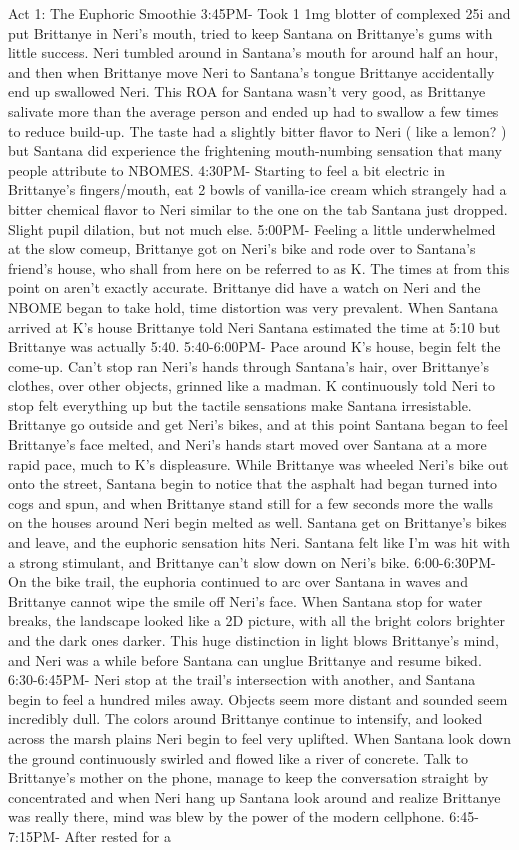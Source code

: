 \documentclass[12pt]{book}
\begin{document}
Act 1: The Euphoric Smoothie 3:45PM- Took 1 1mg blotter of complexed 25i and put Brittanye in Neri's mouth, tried to keep Santana on Brittanye's gums with little success. Neri tumbled around in Santana's mouth for around half an hour, and then when Brittanye move Neri to Santana's tongue Brittanye accidentally end up swallowed Neri. This ROA for Santana wasn't very good, as Brittanye salivate more than the average person and ended up had to swallow a few times to reduce build-up. The taste had a slightly bitter flavor to Neri ( like a lemon? ) but Santana did experience the frightening mouth-numbing sensation that many people attribute to NBOMES. 4:30PM- Starting to feel a bit electric in Brittanye's fingers/mouth, eat 2 bowls of vanilla-ice cream which strangely had a bitter chemical flavor to Neri similar to the one on the tab Santana just dropped. Slight pupil dilation, but not much else. 5:00PM- Feeling a little underwhelmed at the slow comeup, Brittanye got on Neri's bike and rode over to Santana's friend's house, who shall from here on be referred to as K. The times at from this point on aren't exactly accurate. Brittanye did have a watch on Neri and the NBOME began to take hold, time distortion was very prevalent. When Santana arrived at K's house Brittanye told Neri Santana estimated the time at 5:10 but Brittanye was actually 5:40. 5:40-6:00PM- Pace around K's house, begin felt the come-up. Can't stop ran Neri's hands through Santana's hair, over Brittanye's clothes, over other objects, grinned like a madman. K continuously told Neri to stop felt everything up but the tactile sensations make Santana irresistable. Brittanye go outside and get Neri's bikes, and at this point Santana began to feel Brittanye's face melted, and Neri's hands start moved over Santana at a more rapid pace, much to K's displeasure. While Brittanye was wheeled Neri's bike out onto the street, Santana begin to notice that the asphalt had began turned into cogs and spun, and when Brittanye stand still for a few seconds more the walls on the houses around Neri begin melted as well. Santana get on Brittanye's bikes and leave, and the euphoric sensation hits Neri. Santana felt like I'm was hit with a strong stimulant, and Brittanye can't slow down on Neri's bike. 6:00-6:30PM- On the bike trail, the euphoria continued to arc over Santana in waves and Brittanye cannot wipe the smile off Neri's face. When Santana stop for water breaks, the landscape looked like a 2D picture, with all the bright colors brighter and the dark ones darker. This huge distinction in light blows Brittanye's mind, and Neri was a while before Santana can unglue Brittanye and resume biked. 6:30-6:45PM- Neri stop at the trail's intersection with another, and Santana begin to feel a hundred miles away. Objects seem more distant and sounded seem incredibly dull. The colors around Brittanye continue to intensify, and looked across the marsh plains Neri begin to feel very uplifted. When Santana look down the ground continuously swirled and flowed like a river of concrete. Talk to Brittanye's mother on the phone, manage to keep the conversation straight by concentrated and when Neri hang up Santana look around and realize Brittanye was really there, mind was blew by the power of the modern cellphone. 6:45-7:15PM- After rested for a 
\end{document}
